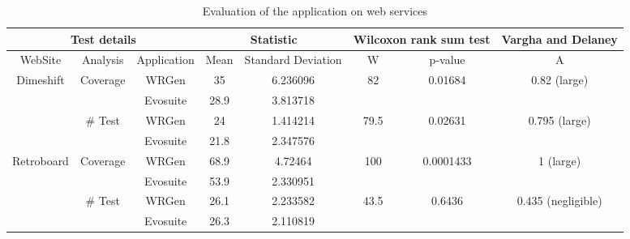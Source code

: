 \begin{table}[h]
	\centering
	\caption{Evaluation of the application on web services}
	\label{table:res}
	\renewcommand*{\arraystretch}{1.25}
	\begin{adjustbox}{max width=\textwidth}
		\begin{tabular}{|c|c|c|c|c|c|c|c|}
			\hline
			\multicolumn{3}{|c|}{Test details} & \multicolumn{2}{c|}{Statistic} & \multicolumn{2}{c|}{Wilcoxon rank sum test} & Vargha and Delaney    \\
			\hline
			WebSite & Analysis & Application & Mean   & Standard Deviation   & W                               & p-value                             & A            			         \\
			\hline
			\multirow{4}{*}{Dimeshift}& \multirow{2}{*}{Coverage} & WRGen       & 35     & 6.236096             & \multirow{2}{*}{82}             & \multirow{2}{*}{0.01684}            & \multirow{2}{*}{0.82 (large)}  \\
			\cline{3-5}
			& & Evosuite    & 28.9   & 3.813718             &                                 &                                     &            			   		 \\
			\cline{2-8}
			& \multirow{2}{*}{\# Test} & WRGen       & 24     & 1.414214             & \multirow{2}{*}{79.5}           & \multirow{2}{*}{0.02631}            & \multirow{2}{*}{0.795 (large)}  \\
			\cline{3-5}
			& & Evosuite    & 21.8   & 2.347576             &                                 &                                     &            			   		 \\
			\hline
			\multirow{4}{*}{Retroboard}& \multirow{2}{*}{Coverage} & WRGen       & 68.9     & 4.72464             & \multirow{2}{*}{100}             & \multirow{2}{*}{0.0001433}            & \multirow{2}{*}{1 (large)}  \\
			\cline{3-5}
			& & Evosuite    & 53.9   & 2.330951            &                                 &                                     &            			   		 \\
			\cline{2-8}
			& \multirow{2}{*}{\# Test} & WRGen       & 26.1     & 2.233582             & \multirow{2}{*}{43.5}             & \multirow{2}{*}{0.6436}            & \multirow{2}{*}{0.435 (negligible)}  \\
			\cline{3-5}
			& & Evosuite    & 26.3   & 2.110819             &                                 &                                     &            			   		 \\

\end{tabular}
\end{adjustbox}
\end{table}
